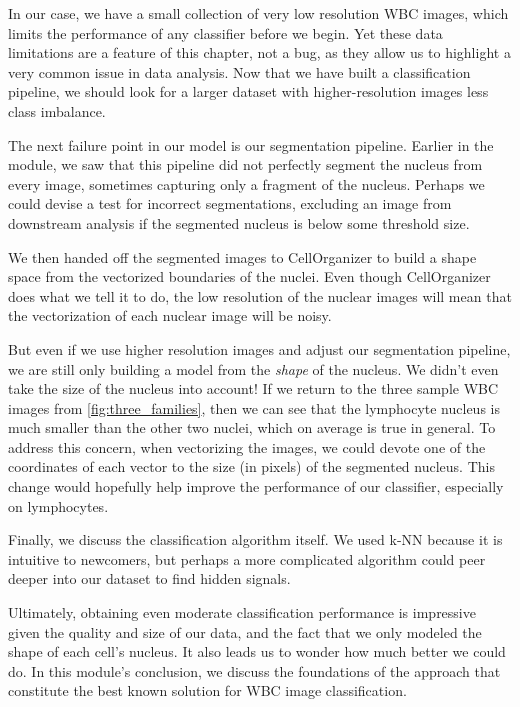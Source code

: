In our case, we have a small collection of very low resolution WBC images, which limits the performance of any classifier before we begin. Yet these data limitations are a feature of this chapter, not a bug, as they allow us to highlight a very common issue in data analysis. Now that we have built a classification pipeline, we should look for a larger dataset with higher-resolution images less class imbalance.

The next failure point in our model is our segmentation pipeline. Earlier in the module, we saw that this pipeline did not perfectly segment the nucleus from every image, sometimes capturing only a fragment of the nucleus. Perhaps we could devise a test for incorrect segmentations, excluding an image from downstream analysis if the segmented nucleus is below some threshold size.

We then handed off the segmented images to CellOrganizer to build a shape space from the vectorized boundaries of the nuclei. Even though CellOrganizer does what we tell it to do, the low resolution of the nuclear images will mean that the vectorization of each nuclear image will be noisy.

But even if we use higher resolution images and adjust our segmentation pipeline, we are still only building a model from the \textit{shape} of the nucleus. We didn't even take the size of the nucleus into account! If we return to the three sample WBC images from \autoref{fig:three_families}, then we can see that the lymphocyte nucleus is much smaller than the other two nuclei, which on average is true in general. To address this concern, when vectorizing the images, we could devote one of the coordinates of each vector to the size (in pixels) of the segmented nucleus. This change would hopefully help improve the performance of our classifier, especially on lymphocytes.\\

\begin{qbox}\end{qbox}

Finally, we discuss the classification algorithm itself. We used k-NN because it is intuitive to newcomers, but perhaps a more complicated algorithm could peer deeper into our dataset to find hidden signals.

Ultimately, obtaining even moderate classification performance is impressive given the quality and size of our data, and the fact that we only modeled the shape of each cell's nucleus. It also leads us to wonder how much better we could do. In this module's conclusion, we discuss the foundations of the approach that constitute the best known solution for WBC image classification.\\

